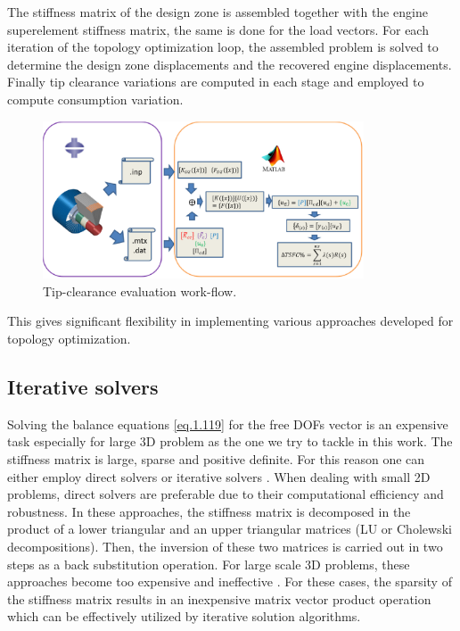 The stiffness matrix of the design zone is assembled together with the engine superelement stiffness matrix, the same is done for the load vectors. For each iteration of the topology optimization loop, the assembled problem is solved to determine the design zone displacements and the recovered engine displacements.  Finally tip clearance variations are computed in each stage and employed to compute consumption variation.
\begin{figure}[hbt!]
\centering
\includegraphics[width=0.85\textwidth]{images/Ch1/tip_cl_wkf.eps}
\caption{Tip-clearance evaluation work-flow. 
\label{f.6b}}
\end{figure}
 This gives significant flexibility in implementing various approaches developed for topology optimization.
\subsection{Iterative solvers}
\label{subsection1.4.2}
Solving the balance equations \ref{eq.1.119} for the free DOFs vector is an expensive task especially for large 3D problem as the one we try to tackle in this work. The stiffness matrix is large, sparse and positive definite. For this reason one can either employ direct solvers \cite{davis2006direct} or
iterative solvers \cite{saad2003iterative}. When dealing with small 2D problems, direct solvers are preferable due to their computational efficiency and robustness. In these approaches, the stiffness matrix is decomposed in the product of a lower triangular and an upper triangular matrices (LU or Cholewski decompositions). Then, the inversion of these two matrices is carried out in two steps as a back substitution operation. For large scale 3D problems, these approaches become too expensive and ineffective \cite{davis2006direct}. For these cases, the sparsity of the stiffness matrix results in an inexpensive matrix vector product operation which can be effectively utilized by iterative solution algorithms.
